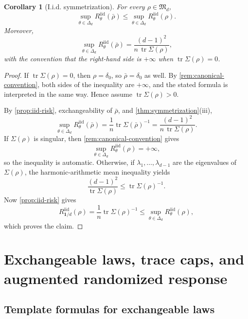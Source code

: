 \documentclass[11pt]{amsart}
\newtheorem{corollary}[corollary]{Corollary}
\theoremstyle{definition}
\DeclareMathOperator{\tr}{tr}
\newcommand{\one}{\mathbf 1}
\newcommand{\fM}{\mathfrak M}
\begin{document}
\begin{corollary}[I.i.d. symmetrization]\label{cor:iid-symm}
For every $\rho\in\fM_d$,
\[
\sup_{\theta\in\Delta_d}R^{\mathrm{iid}}_\theta(\bar\rho)
\le
\sup_{\theta\in\Delta_d}R^{\mathrm{iid}}_\theta(\rho).
\]
Moreover,
\[
\sup_{\theta\in\Delta_d}R^{\mathrm{iid}}_\theta(\bar\rho)
=
\frac{(d-1)^2}{n\,\tr\Sigma(\rho)},
\]
with the convention that the right-hand side is $+\infty$ when $\tr\Sigma(\rho)=0$.
\end{corollary}

\begin{proof}
If $\tr\Sigma(\rho)=0$, then $\rho=\delta_0$, so $\bar\rho=\delta_0$ as well. By \cref{rem:canonical-convention}, both sides of the inequality are $+\infty$, and the stated formula is interpreted in the same way. Hence assume $\tr\Sigma(\rho)>0$.

By \cref{prop:iid-risk}, exchangeability of $\bar\rho$, and \cref{thm:symmetrization}(iii),
\[
\sup_{\theta\in\Delta_d}R^{\mathrm{iid}}_\theta(\bar\rho)
=
\frac1n\tr\Sigma(\bar\rho)^{-1}
=
\frac{(d-1)^2}{n\,\tr\Sigma(\rho)}.
\]
If $\Sigma(\rho)$ is singular, then \cref{rem:canonical-convention} gives
\[
\sup_{\theta\in\Delta_d}R^{\mathrm{iid}}_\theta(\rho)=+\infty,
\]
so the inequality is automatic. Otherwise, if $\lambda_1,\dots,\lambda_{d-1}$ are the eigenvalues of $\Sigma(\rho)$, the harmonic-arithmetic mean inequality yields
\[
\frac{(d-1)^2}{\tr\Sigma(\rho)}\le \tr\Sigma(\rho)^{-1}.
\]
Now \cref{prop:iid-risk} gives
\[
R^{\mathrm{iid}}_{\one/d}(\rho)=\frac1n\tr\Sigma(\rho)^{-1}\le \sup_{\theta\in\Delta_d}R^{\mathrm{iid}}_\theta(\rho),
\]
which proves the claim.
\end{proof}


\section{Exchangeable laws, trace caps, and augmented randomized response}\label{sec:tracecap}

\subsection{Template formulas for exchangeable laws}
\end{document}
